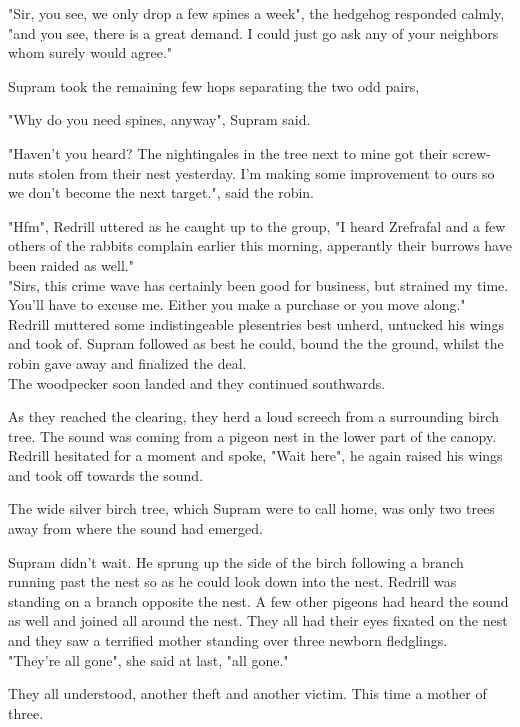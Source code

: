 \documentclass[smalldemyvopaper,11pt,twoside,onecolumn,openright,extrafontsizes]{memoir}
\newlength\drop
\begin{document}
"Sir, you see, we only drop a few spines a week", the hedgehog responded calmly, "and you see, there is a great demand. I could just go ask any of your neighbors whom surely would agree."

Supram took the remaining few hops separating the two odd pairs,

"Why do you need spines, anyway", Supram said.

"Haven't you heard? The nightingales in the tree next to mine got their screw-nuts stolen from their nest yesterday. I'm making some improvement to ours so we don't become the next target.", said the robin.

"Hfm", Redrill uttered as he caught up to the group, "I heard Zrefrafal and a few others of the rabbits complain earlier this morning, apperantly their burrows have been raided as well."\\

"Sirs, this crime wave has certainly been good for business, but strained my time. You'll have to excuse me. Either you make a purchase or you move along."\\

Redrill muttered some indistingeable plesentries best unherd, untucked his wings and took of. Supram followed as best he could, bound the the ground, whilst the robin gave away and finalized the deal.\\

The woodpecker soon landed and they continued southwards. 

As they reached the clearing, they herd a loud screech from a surrounding birch tree. The sound was coming from a pigeon nest in the lower part of the canopy. Redrill hesitated for a moment and spoke, "Wait here", he again raised his wings and took off towards the sound. 

The wide silver birch tree, which Supram were to call home, was only two trees away from where the sound had emerged.

Supram didn't wait. He sprung up the side of the birch following a branch running past the nest so as he could look down into the nest. Redrill was standing on a branch opposite the nest. A few other pigeons had heard the sound as well and joined all around the nest. They all had their eyes fixated on the nest and they saw a terrified mother standing over three newborn fledglings.\\

"They're all gone", she said at last, "all gone."

They all understood, another theft and another victim. This time a mother of three. 
\end{document}
